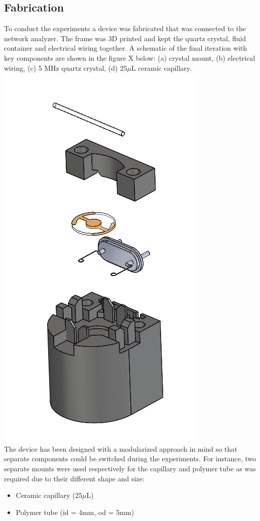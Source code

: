 \documentclass[a4paper, 10pt, conference]{ieeeconf}      %
\begin{document}
\subsection{Fabrication}
    To conduct the experiments a device was fabricated that was connected to the network analyzer. 
    The frame was 3D printed and kept the quartz crystal, fluid container and electrical wiring together.
    A schematic of the final iteration with key components are shown in the figure X below: (a) crystal mount, (b) electrical wiring, (c) 5 MHz quartz crystal, (d) 25$\mu$L ceramic capillary.\\
\includegraphics[scale=0.5]{capillary.PNG} \\

    The device has been designed with a modularized approach in mind so that separate components could be switched during the experiments. For instance, two separate mounts were used respectively for the capillary and polymer tube as was required due to their different shape and size: 
\begin{itemize}
    \item Ceramic capillary (25$\mu$L)
    \item Polymer tube (id = 4mm, od = 5mm)
\end{itemize}
\end{document}

